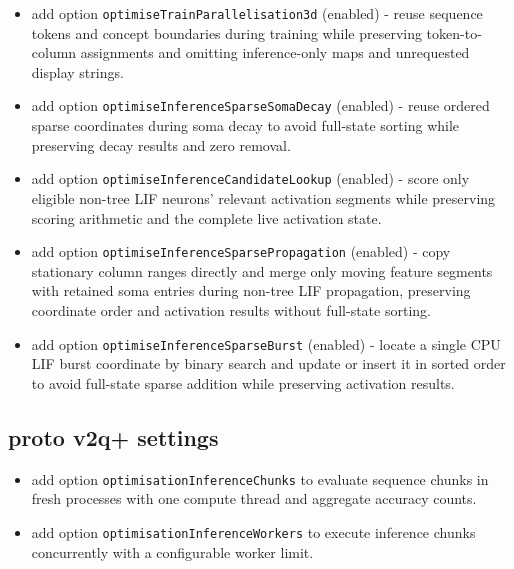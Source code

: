 \begin{itemize}
	\item add option \texttt{optimiseTrainParallelisation3d} (enabled) - reuse sequence tokens and concept boundaries during training while preserving token-to-column assignments and omitting inference-only maps and unrequested display strings.
	\item add option \texttt{optimiseInferenceSparseSomaDecay} (enabled) - reuse ordered sparse coordinates during soma decay to avoid full-state sorting while preserving decay results and zero removal.
	\item add option \texttt{optimiseInferenceCandidateLookup} (enabled) - score only eligible non-tree LIF neurons' relevant activation segments while preserving scoring arithmetic and the complete live activation state.
	\item add option \texttt{optimiseInferenceSparsePropagation} (enabled) - copy stationary column ranges directly and merge only moving feature segments with retained soma entries during non-tree LIF propagation, preserving coordinate order and activation results without full-state sorting.
	\item add option \texttt{optimiseInferenceSparseBurst} (enabled) - locate a single CPU LIF burst coordinate by binary search and update or insert it in sorted order to avoid full-state sparse addition while preserving activation results.
\end{itemize}

\subsection{proto v2q+ settings}
\begin{itemize}
	\item add option \texttt{optimisationInferenceChunks} to evaluate sequence chunks in fresh processes with one compute thread and aggregate accuracy counts.
	\item add option \texttt{optimisationInferenceWorkers} to execute inference chunks concurrently with a configurable worker limit.
\end{itemize}


